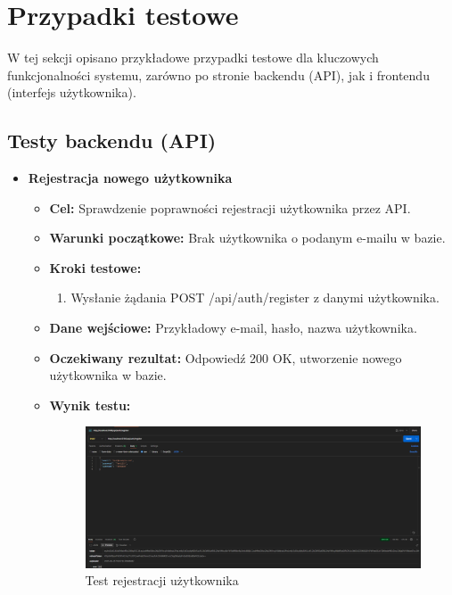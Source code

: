 \chapter{Przypadki testowe}

W tej sekcji opisano przykładowe przypadki testowe dla kluczowych funkcjonalności systemu, zarówno po stronie backendu (API), jak i frontendu (interfejs użytkownika).

\section{Testy backendu (API)}

\begin{itemize}
    \item \textbf{Rejestracja nowego użytkownika}
    \begin{itemize}
        \item \textbf{Cel:} Sprawdzenie poprawności rejestracji użytkownika przez API.
        \item \textbf{Warunki początkowe:} Brak użytkownika o podanym e-mailu w bazie.
        \item \textbf{Kroki testowe:}
        \begin{enumerate}
            \item Wysłanie żądania POST /api/auth/register z danymi użytkownika.
        \end{enumerate}
        \item \textbf{Dane wejściowe:} Przykładowy e-mail, hasło, nazwa użytkownika.
        \item \textbf{Oczekiwany rezultat:} Odpowiedź 200 OK, utworzenie nowego użytkownika w bazie.
        \item \textbf{Wynik testu:}
        \begin{figure}[H]
            \includegraphics[width=480px]{figures/testy/test-registration.png}
            \caption{Test rejestracji użytkownika}
        \end{figure}
    \end{itemize}


\end{itemize}
